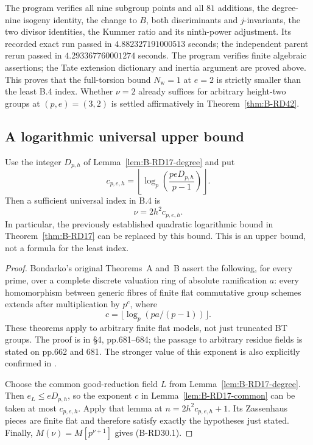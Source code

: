 \begin{remark}\label{auto:B:7f506124b28c}

The program  verifies all
nine subgroup points and all $81$ additions, the degree-nine
isogeny identity, the change to $B$, both discriminants and
$j$-invariants, the two divisor identities, the Kummer ratio and
its ninth-power adjustment. Its recorded exact run passed in
$4.882327191000513$ seconds; the independent parent rerun passed
in $4.293367760001274$ seconds. The program verifies finite
algebraic assertions; the Tate extension dictionary and inertia
argument are proved above.
This proves that the full-torsion bound $N_{\mathrm w}=1$ at
$e=2$ is strictly smaller than the least B.4 index. Whether
$\nu=2$ already suffices for arbitrary height-two groups at
$(p,e)=(3,2)$ is settled affirmatively in Theorem~\ref{thm:B-RD42}.
\end{remark}


\subsection{A logarithmic universal upper bound}

\begin{proposition}
\label{prop:B-RD30}
Use the integer $D_{p,h}$ of Lemma~\ref{lem:B-RD17-degree} and put
\[
 c_{p,e,h}=\left\lfloor\log_p\left(\frac{peD_{p,h}}{p-1}\right)
                  \right\rfloor.
\]
Then a sufficient universal index in B.4 is
\[
                    \nu=2h^2c_{p,e,h}.                 \tag{B-RD30.1}
\]
In particular, the previously established quadratic logarithmic
bound in Theorem~\ref{thm:B-RD17} can be replaced by this bound.
This is an upper bound, not a formula for the least index.
\end{proposition}
\begin{proof}
Bondarko's original Theorems~A and~B
\cite[p.661]{Bondarko2006Generic} assert the following, for every
prime, over a complete discrete valuation ring of absolute
ramification $a$: every homomorphism between generic fibres of
finite flat commutative group schemes extends after multiplication
by $p^c$, where
\[
                  c=\lfloor\log_p(pa/(p-1))\rfloor.
\]
These theorems apply to arbitrary finite flat models, not just
truncated BT groups. The proof is in \S4, pp.681--684; the passage
to arbitrary residue fields is stated on pp.662 and 681. The
stronger value of this exponent is also explicitly confirmed in
\cite[p.2 of the author version]{VasiuZink2012Boundedness}.

Choose the common good-reduction field $L$ from
Lemma~\ref{lem:B-RD17-degree}. Then $e_L\leq eD_{p,h}$, so the
exponent $c$ in Lemma~\ref{lem:B-RD17-common} can be taken at most
$c_{p,e,h}$. Apply that lemma at
$n=2h^2c_{p,e,h}+1$. Its Zassenhaus pieces are finite flat and
therefore satisfy exactly the hypotheses just stated. Finally,
$M(\nu)=M[p^{\nu+1}]$ gives (B-RD30.1).
\end{proof}


